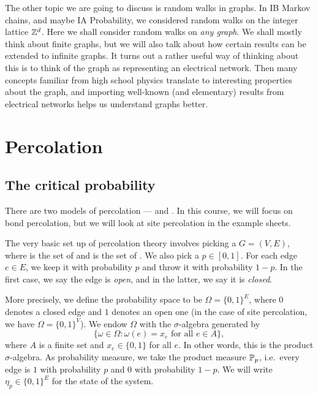 \documentclass[a4paper]{article}
\begin{document}
The other topic we are going to discuss is random walks in graphs. In IB Markov chains, and maybe IA Probability, we considered random walks on the integer lattice $\Z^d$. Here we shall consider random walks on \emph{any graph}. We shall mostly think about finite graphs, but we will also talk about how certain results can be extended to infinite graphs. It turns out a rather useful way of thinking about this is to think of the graph as representing an electrical network. Then many concepts familiar from high school physics translate to interesting properties about the graph, and importing well-known (and elementary) results from electrical networks helps us understand graphs better.

\section{Percolation}
\subsection{The critical probability}
There are two models of percolation ---  and . In this course, we will focus on bond percolation, but we will look at site percolation in the example sheets.

The very basic set up of percolation theory involves picking a  $G = (V, E)$, where  is the set of  and  is the set of . We also pick a  $p \in [0, 1]$. For each edge $e \in E$, we keep it with probability $p$ and throw it with probability $1 - p$. In the first case, we say the edge is \emph{open}, and in the latter, we say it is \emph{closed}.

More precisely, we define the probability space to be $\Omega= \{0, 1\}^E$, where $0$ denotes a closed edge and $1$ denotes an open one (in the case of site percolation, we have $\Omega = \{0, 1\}^V$). We endow $\Omega$ with the $\sigma$-algebra generated by 
\[
  \{\omega \in \Omega: \omega(e) = x_e \text{ for all }e \in A\},
\]
where $A$ is a finite set and $x_e \in \{0, 1\}$ for all $e$. In other words, this is the product $\sigma$-algebra. As probability measure, we take the product measure $\P_p$, i.e.\ every edge is $1$ with probability $p$ and $0$ with probability $1 - p$. We will write $\eta_p \in \{0, 1\}^E$ for the state of the system.
\end{document}
